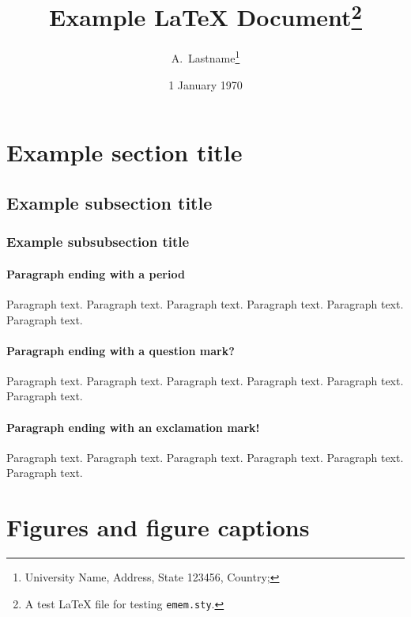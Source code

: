 \documentclass{article}
\title[Custom Head Title Appears Here]{Example {\LaTeX} Document\thanks{A test {\LaTeX} file for testing \texttt{emem.sty}.}}
\author{A.~Lastname\thanks{University Name, Address, State 123456, Country; \email{a.lastname@mail.zz}}}
\date{1 January 1970}
\begin{document}
\maketitle

\begin{abstract}
  \lipsum[1]
\end{abstract}

\tableofcontents

\section{Example section title}
\lipsum[1]

\subsection{Example subsection title}
\lipsum[2]

\subsubsection{Example subsubsection title}
\lipsum[3]

\paragraph{Paragraph ending with a period}
Paragraph text.
Paragraph text.
Paragraph text.
Paragraph text.
Paragraph text.
Paragraph text.

\paragraph{Paragraph ending with a question mark?}
Paragraph text.
Paragraph text.
Paragraph text.
Paragraph text.
Paragraph text.
Paragraph text.

\paragraph{Paragraph ending with an exclamation mark!}
Paragraph text.
Paragraph text.
Paragraph text.
Paragraph text.
Paragraph text.
Paragraph text.
\par



\lipsum[5-8]

\section{Figures and figure captions}
\end{document}
